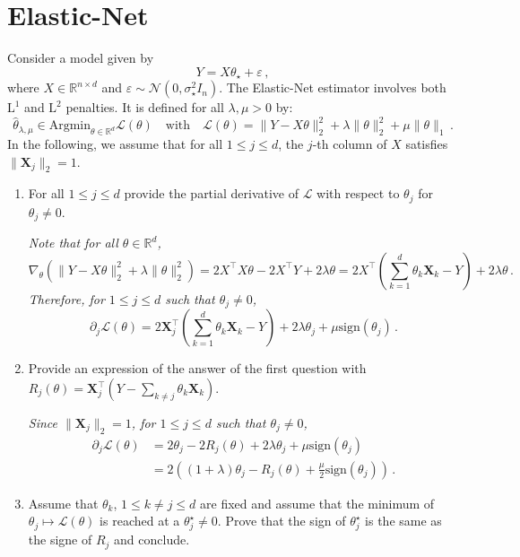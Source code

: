 \documentclass[a4paper,10pt,fleqn]{article}
\newcommand{\eqsp}{\,}
\newcommand{\rset}{\ensuremath{\mathbb{R}}}
\newcommand{\1}{\ensuremath{\mathbbm{1}}}
\begin{document}
\section{Elastic-Net}
Consider a model given by 
$$
Y = X\theta_\star + \varepsilon\,,
$$
where $X\in\mathbb{R}^{n\times d}$ and $\varepsilon \sim \mathcal{N}(0,\sigma_\star^2I_n)$. The Elastic-Net estimator involves both $\mathrm{L}^1$ and $\mathrm{L}^2$ penalties. It is defined for all $\lambda,\mu>0$ by:
$$
\widehat{\theta}_{\lambda,\mu}\in\mathrm{Argmin}_{\theta\in\mathbb{R}^d} \mathcal{L}(\theta)\quad\mathrm{with} \quad \mathcal{L}(\theta) = \|Y-X\theta\|_2^2 + \lambda \|\theta\|_2^2 + \mu \|\theta\|_1\,.
 $$
In the following, we assume that for all $1\leq j\leq d$, the $j$-th column of $X$ satisfies $\|\mathbf{X}_j\|_2 = 1$.
\begin{enumerate}
\item For all $1\leq j \leq d$ provide the partial derivative of $\mathcal{L}$ with respect to $\theta_j$ for $\theta_j\neq 0$. 

\vspace{.2cm}

{\em
Note that for all $\theta\in\rset^d$,
$$
\nabla_\theta(\|Y-X\theta\|_2^2 + \lambda \|\theta\|_2^2) = 2X^\top X\theta - 2 X^\top Y+ 2\lambda \theta = 2X^\top \left(\sum_{k=1}^d \theta_k\mathbf{X}_k - Y\right)  + 2\lambda \theta\eqsp.
$$
Therefore, for $1\leq j \leq d$ such that $\theta_j\neq 0$,
$$
\partial_j  \mathcal{L}(\theta) = 2\mathbf{X}^\top_j \left(\sum_{k=1}^d \theta_k\mathbf{X}_k -Y\right)+ 2\lambda \theta_j + \mu \mathrm{sign}(\theta_j) \eqsp.
$$
}
\item Provide an expression of the answer of the first question with $R_j(\theta) = \mathbf{X}_j^\top(Y - \sum_{k\neq j}\theta_k\mathbf{X}_k)$.

\vspace{.2cm}

{\em
Since $\|\mathbf{X}_j\|_2 = 1$, for $1\leq j \leq d$ such that $\theta_j\neq 0$,
\begin{align*}
\partial_j  \mathcal{L}(\theta) &= 2\theta_j -2R_j(\theta)+ 2\lambda \theta_j + \mu \mathrm{sign}(\theta_j)\\
&= 2\left((1+\lambda)\theta_j -R_j(\theta) + \frac{\mu}{2} \mathrm{sign}(\theta_j)\right)\eqsp.
\end{align*}
}
\item Assume that $\theta_k$, $1\leq k\neq j \leq d$ are fixed and assume that the minimum of $\theta_j \mapsto \mathcal{L}(\theta)$ is reached at a $\theta^\star_j\neq 0$. Prove that the sign of $\theta^\star_j$ is the same as the signe of $R_j$ and conclude.


\end{enumerate}
\end{document}
